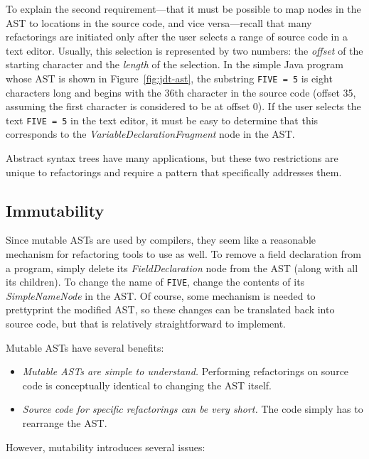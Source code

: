 \documentclass[prodmode]{acmlarge}
\newcommand{\ttt}[1]{\texttt{#1}}
\begin{document}
To explain the second requirement---that it must be possible to map nodes in
the AST to locations in the source code, and vice versa---recall that many
refactorings are initiated only after the user selects a range of source code
in a text editor.  Usually, this selection is represented by two numbers: the
\textit{offset} of the starting character and the \textit{length} of the
selection.  In the simple Java program whose AST is shown in
Figure~\ref{fig:jdt-ast}, the substring \ttt{FIVE = 5} is eight characters long
and begins with the 36th character in the source code (offset 35, assuming the
first character is considered to be at offset 0).  If the user selects the text
\ttt{FIVE = 5} in the text editor, it must be easy to determine that this
corresponds to the \textit{VariableDeclarationFragment} node in the AST.

Abstract syntax trees have many applications, but these two restrictions are
unique to refactorings and require a pattern that specifically addresses them.

\subsection{Immutability}

Since mutable ASTs are used by compilers, they seem like a reasonable mechanism for refactoring tools to use
as well.  To remove a field declaration from a program, simply delete its
\textit{FieldDeclaration} node from the AST (along with all its children).  To
change the name of \ttt{FIVE}, change the contents of its
\textit{SimpleNameNode} in the AST.  Of course, some mechanism is needed to
prettyprint the modified AST, so these changes can be translated back into
source code, but that is relatively straightforward to implement.

Mutable ASTs have several benefits:
\begin{itemize}
    \item \textit{Mutable ASTs are simple to understand.} Performing 
        refactorings on source code is conceptually identical to changing 
        the AST itself.
    \item \textit{Source code for specific refactorings can be very short.} 
        The code simply has to rearrange the AST.
    
\end{itemize}

However, mutability introduces several issues:

\FloatBarrier
\end{document}
